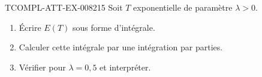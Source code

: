 \begin{exercice}{TCOMPL-ATT-EX-008}{2}{15}
Soit $T$ exponentielle de paramètre $\lambda>0$.
\begin{enumerate}
  \item Écrire $E(T)$ sous forme d'intégrale.
  \item Calculer cette intégrale par une intégration par parties.
  \item Vérifier pour $\lambda=0{,}5$ et interpréter.
\end{enumerate}
\end{exercice}
